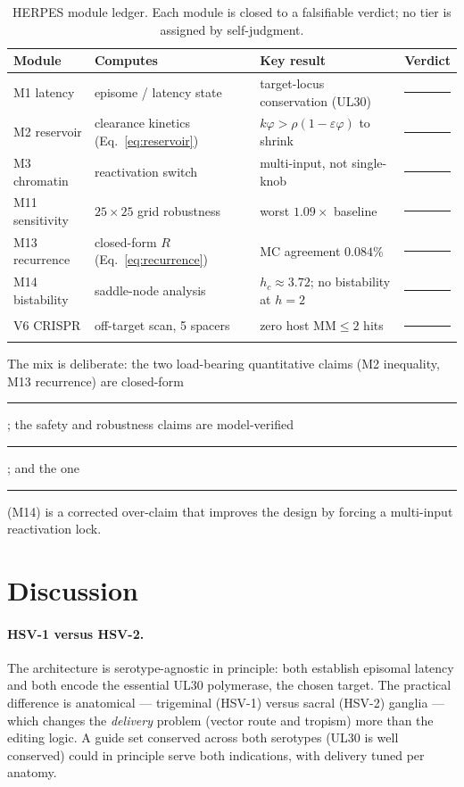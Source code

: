 \documentclass[11pt,a4paper]{article}
\newcommand{\tierdisc}[1]{\textcolor{#1}{\rule[0.05ex]{1.0ex}{1.0ex}}}
\newcommand{\tierBlue}{\tierdisc{blue!70!black}}
\newcommand{\tierGreen}{\tierdisc{green!60!black}}
\newcommand{\tierRed}{\tierdisc{red!80!black}}
\begin{document}
\begin{table}[h]
\centering
\caption{HERPES module ledger. Each module is closed to a falsifiable verdict;
no tier is assigned by self-judgment.}
\label{tab:modules}
\small
\begin{tabular}{@{}llll@{}}
\toprule
Module & Computes & Key result & Verdict \\
\midrule
M1 latency & episome / latency state & target-locus conservation (UL30) & \tierGreen{} \\
M2 reservoir & clearance kinetics (Eq.~\ref{eq:reservoir}) & $k\varphi>\rho(1-\varepsilon\varphi)$ to shrink & \tierBlue{} \\
M3 chromatin & reactivation switch & multi-input, not single-knob & \tierGreen{} \\
M11 sensitivity & $25\times25$ grid robustness & worst $1.09\times$ baseline & \tierGreen{} \\
M13 recurrence & closed-form $R$ (Eq.~\ref{eq:recurrence}) & MC agreement $0.084\%$ & \tierBlue{} \\
M14 bistability & saddle-node analysis & $h_c\approx3.72$; no bistability at $h{=}2$ & \tierRed{} \\
V6 CRISPR & off-target scan, 5 spacers & zero host MM$\le2$ hits & \tierGreen{} \\
\bottomrule
\end{tabular}
\end{table}

The mix is deliberate: the two load-bearing quantitative claims (M2 inequality,
M13 recurrence) are closed-form \tierBlue{}; the safety and robustness claims are
model-verified \tierGreen{}; and the one \tierRed{} (M14) is a corrected
over-claim that improves the design by forcing a multi-input reactivation lock.

\section{Discussion}
\label{sec:discussion}
\paragraph{HSV-1 versus HSV-2.}
The architecture is serotype-agnostic in principle: both establish episomal
latency and both encode the essential UL30 polymerase, the chosen target. The
practical difference is anatomical --- trigeminal (HSV-1) versus sacral
(HSV-2) ganglia --- which changes the \emph{delivery} problem (vector route and
tropism) more than the editing logic. A guide set conserved across both
serotypes (UL30 is well conserved) could in principle serve both indications,
with delivery tuned per anatomy.
\end{document}
